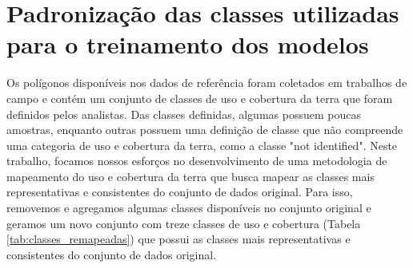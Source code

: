 
\section{Padronização das classes utilizadas para o treinamento dos modelos}

Os polígonos disponíveis nos dados de referência foram coletados em trabalhos de campo e contém um conjunto de classes de uso e cobertura da terra que foram definidos pelos analistas. Das classes definidas, algumas possuem poucas amostras, enquanto outras possuem uma definição de classe que não compreende uma categoria de uso e cobertura da terra, como a classe "not identified". Neste trabalho, focamos nossos esforços no desenvolvimento de uma metodologia de mapeamento do uso e cobertura da terra que busca mapear as classes mais representativas e consistentes do conjunto de dados original. Para isso, removemos e agregamos algumas classes disponíveis no conjunto original e geramos um novo conjunto com treze classes de uso e cobertura (Tabela \ref{tab:classes_remapeadas}) que possui as classes mais representativas e consistentes do conjunto de dados original. 

